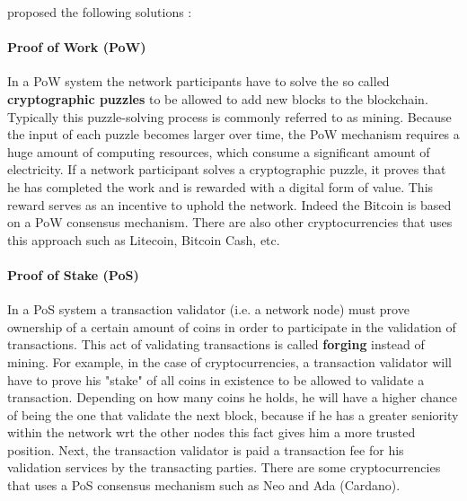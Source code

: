 proposed the following solutions :

\paragraph{Proof of Work (PoW)} In a PoW system the network participants have to solve the so called \textbf{cryptographic puzzles} to be allowed to add new blocks to the blockchain. Typically this puzzle-solving process is commonly referred to as mining. Because the input of each puzzle becomes larger over time, the PoW mechanism requires a huge amount of computing resources, which consume a significant amount of electricity. If a network participant solves a cryptographic puzzle, it proves that he has completed the work and is rewarded with a digital form of value. This reward serves as an incentive to uphold the network. Indeed the Bitcoin is based on a PoW consensus mechanism. There are also other cryptocurrencies that uses this approach such as Litecoin, Bitcoin Cash, etc.

\paragraph{Proof of Stake (PoS)} In a PoS system a transaction validator (i.e. a network node) must prove ownership of a certain amount of coins in order to participate in the validation of transactions. This act of validating transactions is called \textbf{forging} instead of mining. For example, in the case of cryptocurrencies, a transaction validator will have to prove his "stake" of all coins in existence to be allowed to validate a transaction. Depending on how many coins he holds, he will have a higher chance of being the one that validate the next block, because if he has a greater seniority within the network wrt the other nodes this fact gives him a more trusted position. Next, the transaction validator is paid a transaction fee for his validation services by the transacting parties. There are some cryptocurrencies that uses a PoS consensus mechanism such as Neo and Ada (Cardano).

